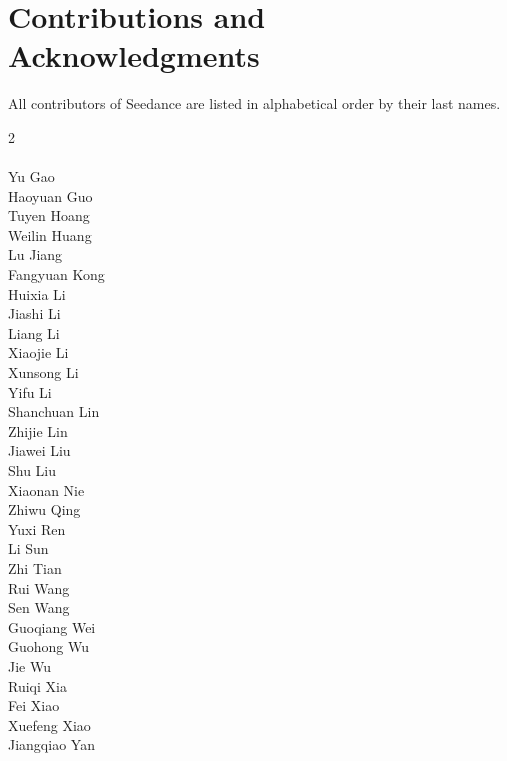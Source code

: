 \section{Contributions and Acknowledgments}
\label{contributions}

All contributors of Seedance are listed in alphabetical order by their last names.

\begin{multicols}{2} %
 \\
\\
\color{seedblue}Yu Gao\\
\color{seedblue}Haoyuan Guo\\
\color{seedblue}Tuyen Hoang\\
\color{seedblue}Weilin Huang\\
\color{seedblue}Lu Jiang\\
\color{seedblue}Fangyuan Kong\\
\color{seedblue}Huixia Li\\
\color{seedblue}Jiashi Li\\
\color{seedblue}Liang Li\\
\color{seedblue}Xiaojie Li\\
\color{seedblue}Xunsong Li\\
\color{seedblue}Yifu Li\\
\color{seedblue}Shanchuan Lin\\
\color{seedblue}Zhijie Lin\\
\color{seedblue}Jiawei Liu\\
\color{seedblue}Shu Liu\\
\color{seedblue}Xiaonan Nie\\
\color{seedblue}Zhiwu Qing\\
\color{seedblue}Yuxi Ren\\
\color{seedblue}Li Sun\\
\color{seedblue}Zhi Tian\\
\color{seedblue}Rui Wang\\
\color{seedblue}Sen Wang\\
\color{seedblue}Guoqiang Wei\\
\color{seedblue}Guohong Wu\\
\color{seedblue}Jie Wu\\
\color{seedblue}Ruiqi Xia\\
\color{seedblue}Fei Xiao\\
\color{seedblue}Xuefeng Xiao\\
\color{seedblue}Jiangqiao Yan\\

\end{multicols}
